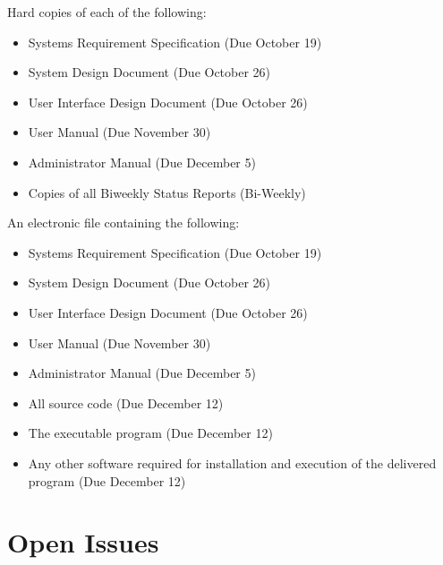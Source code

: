 \documentclass{article}
\begin{document}
Hard copies of each of the following:

\vspace{2.5mm}

\begin{adjustwidth}{2em}{0pt}
\begin{itemize}

\item Systems Requirement Specification (Due October 19)
\item System Design Document (Due October 26)
\item User Interface Design Document (Due October 26)
\item User Manual (Due November 30)
\item Administrator Manual (Due December 5)
\item Copies of all Biweekly Status Reports (Bi-Weekly)

\end{itemize}
\end{adjustwidth}

\vspace{5mm}

An electronic file containing the following: 

\vspace{2.5mm}

\begin{adjustwidth}{2em}{0pt}
\begin{itemize}

\item Systems Requirement Specification (Due October 19)
\item System Design Document (Due October 26)
\item User Interface Design Document (Due October 26)
\item User Manual (Due November 30)
\item Administrator Manual (Due December 5)
\item All source code (Due December 12)
\item The executable program (Due December 12)
\item Any other software required for installation and execution of the delivered program (Due December 12)

\end{itemize}
\end{adjustwidth}


\section{Open Issues}\label{sec:openIssues}
\end{document}
